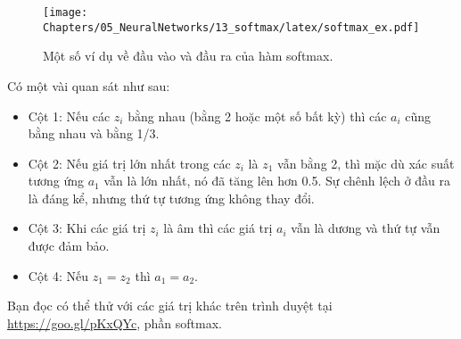 \begin{figure}[t]
\centering
\texttt{[image: Chapters/05\_NeuralNetworks/13\_softmax/latex/softmax\_ex.pdf]}
\caption[]{Một số ví dụ về đầu vào và đầu ra của hàm softmax.}
\label{fig:13_3}
\end{figure}
\newpage
Có một vài quan sát như sau:
\begin{itemize}
\item Cột 1: Nếu các $z_i$ bằng nhau (bằng 2 hoặc một số bất kỳ) thì các $a_i$
cũng bằng nhau
và bằng 1/3.

\item Cột 2: Nếu giá trị lớn nhất trong các $z_i$ là $z_1$ vẫn bằng 2, thì mặc
dù xác suất
tương ứng $a_1$ vẫn là lớn nhất, nó đã tăng lên hơn 0.5. Sự chênh lệch ở
đầu ra là đáng kể, nhưng thứ tự tương ứng không thay đổi.

\item Cột 3: Khi các giá trị $z_i$ là âm thì các giá trị $a_i$ vẫn là dương và thứ tự vẫn được đảm bảo.

\item Cột 4: Nếu $z_1 = z_2$ thì $a_1 = a_2$.
\end{itemize}

Bạn đọc có thể thử với các giá trị khác trên trình duyệt tại
\url{https://goo.gl/pKxQYc}, phần softmax.


